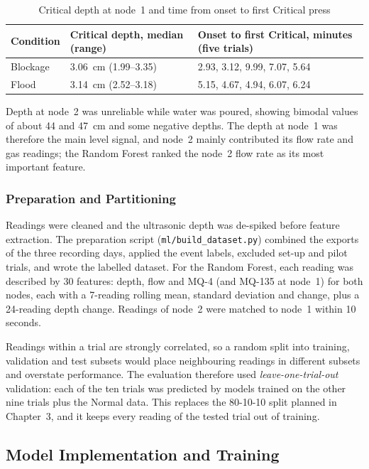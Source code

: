 \documentclass[12pt, a4paper]{article}
\begin{document}
\begin{table}[H]
\centering

\begin{tabular}{|l|p{3.6cm}|p{5.2cm}|}
\hline
\textbf{Condition} & \textbf{Critical depth, median (range)} & \textbf{Onset to first Critical, minutes (five trials)} \\
\hline
Blockage & 3.06~cm (1.99--3.35) & 2.93, 3.12, 9.99, 7.07, 5.64 \\
\hline
Flood & 3.14~cm (2.52--3.18) & 5.15, 4.67, 4.94, 6.07, 6.24 \\
\hline
\end{tabular}
\caption{Critical depth at node~1 and time from onset to first Critical press}
\label{tab:critical-depth}
\end{table}

Depth at node~2 was unreliable while water was poured, showing bimodal values of about 44 and 47~cm and some negative depths. The depth at node~1 was therefore the main level signal, and node~2 mainly contributed its flow rate and gas readings; the Random Forest ranked the node~2 flow rate as its most important feature.

\subsubsection{Preparation and Partitioning}

Readings were cleaned and the ultrasonic depth was de-spiked before feature extraction. The preparation script (\texttt{ml/build\_dataset.py}) combined the exports of the three recording days, applied the event labels, excluded set-up and pilot trials, and wrote the labelled dataset. For the Random Forest, each reading was described by 30 features: depth, flow and MQ-4 (and MQ-135 at node~1) for both nodes, each with a 7-reading rolling mean, standard deviation and change, plus a 24-reading depth change. Readings of node~2 were matched to node~1 within 10 seconds.

Readings within a trial are strongly correlated, so a random split into training, validation and test subsets would place neighbouring readings in different subsets and overstate performance. The evaluation therefore used \emph{leave-one-trial-out} validation: each of the ten trials was predicted by models trained on the other nine trials plus the Normal data. This replaces the 80-10-10 split planned in Chapter~3, and it keeps every reading of the tested trial out of training.

\subsection{Model Implementation and Training}
\label{sec:models}
\end{document}

